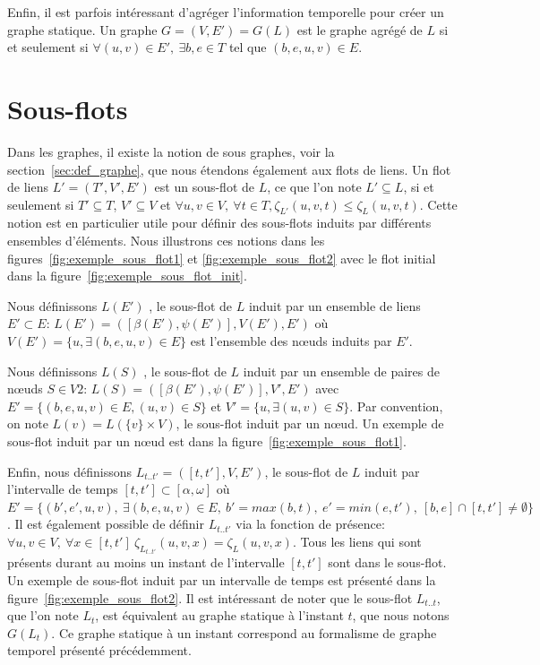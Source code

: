 Enfin, il est parfois intéressant d'agréger l'information temporelle pour créer un graphe statique.
Un graphe $G=(V,E')=G(L)$ est le graphe agrégé de $L$ si et seulement si $\forall (u,v) \in E',\ \exists b,e \in T$ tel que $(b,e,u,v) \in E$.




\section{Sous-flots}
Dans les graphes, il existe la notion de sous graphes, voir la section~\ref{sec:def_graphe}, que nous étendons également aux flots de liens.
Un flot de liens $L'=(T',V',E')$ est un sous-flot de $L$, ce que l'on note $L' \subseteq L$, si et seulement si $T'\subseteq T$, $V'\subseteq V$ et  $\forall u,v \in V,\ \forall t\in T, \zeta_{L'}(u,v,t) \leq \zeta_{L}(u,v,t)$.
Cette notion est en particulier utile pour définir des sous-flots induits par différents ensembles d'éléments.
Nous illustrons ces notions dans les figures~\ref{fig:exemple_sous_flot1} et \ref{fig:exemple_sous_flot2} avec le flot initial dans la figure~\ref{fig:exemple_sous_flot_init}.
 
Nous définissons $L(E')$ , le sous-flot de $L$ induit par un ensemble de liens $E' \subset E$: $L(E')=([\beta(E'),\psi(E')],V(E'),E')$ où $V(E')=\{u, \exists (b,e,u,v) \in E\}$ est l'ensemble des n\oe{}uds induits par $E'$.

 
Nous définissons $L(S)$ , le sous-flot de $L$ induit par un ensemble de paires de n\oe{}uds $S \in V2$: $L(S)=([\beta(E'),\psi(E')],V',E')$ avec $E'= \{(b,e,u,v) \in E, (u,v) \in S\}$ et $V'=\{u, \exists (u,v) \in S\}$.
Par convention, on note $L(v)= L(\{v\}\times V)$, le sous-flot induit par un n\oe{}ud.
Un exemple de sous-flot induit par un n\oe{}ud est dans la figure~\ref{fig:exemple_sous_flot1}.


Enfin, nous définissons $L_{t..t'}=([t, t'], V,E')$, le sous-flot de $L$ induit par l'intervalle de temps $[t,t'] \subset [\alpha, \omega]$ où $E'= \{(b',e',u,v),\ \exists (b,e,u,v) \in E,\ b'= max(b,t),\ e'=min(e,t'),\ [b,e]\cap [t,t']\neq \emptyset\}$.
Il est également possible de définir $L_{t..t'}$ via la fonction de présence: $\forall u,v \in V,\ \forall x \in [t,t']\  \zeta_{L_{t..t'}}(u,v,x) = \zeta_{L}(u,v,x)$.
Tous les liens qui sont présents durant au moins un instant de l'intervalle $[t, t']$ sont dans le sous-flot.
Un exemple de sous-flot induit par un intervalle de temps est présenté dans la figure~\ref{fig:exemple_sous_flot2}.
Il est intéressant de noter que le sous-flot $L_{t..t}$, que l'on note $L_t$, est équivalent au graphe statique à l'instant $t$,  que nous notons $G(L_t)$.
Ce graphe statique à un instant correspond au formalisme de graphe temporel présenté précédemment.


